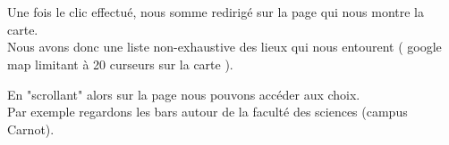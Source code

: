 \documentclass[10pt,a4paper, landscape]{report}
\begin{document}
{{\newpage
\section{}

Une fois le clic effectué, nous somme redirigé sur la page qui nous montre la carte. \\
Nous avons donc une liste non-exhaustive des lieux qui nous entourent ( google map limitant à 20 curseurs sur la carte ). \\
{%
\setlength{\fboxsep}{0pt}%
\setlength{\fboxrule}{2pt}%
%

\newpage
En "scrollant" alors sur la page nous pouvons accéder aux choix. \\
Par exemple regardons les bars autour de la faculté des sciences (campus Carnot). \\
{%
\setlength{\fboxsep}{0pt}%
\setlength{\fboxrule}{2pt}%
%

\newpage
\section{}

}}}}
\end{document}

